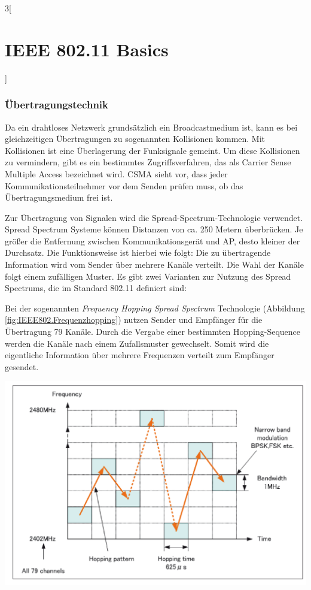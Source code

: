 \begin{multicols}{3}[\section{IEEE 802.11 Basics}]
\subsubsection*{Übertragungstechnik}
Da ein drahtloses Netzwerk grundsätzlich ein Broadcastmedium ist, kann es bei gleichzeitigen Übertragungen zu sogenannten Kollisionen kommen. Mit Kollisionen ist eine Überlagerung der Funksignale gemeint. Um diese Kollisionen zu vermindern, gibt es ein bestimmtes Zugriffsverfahren, das als Carrier Sense Multiple Access bezeichnet wird. CSMA sieht vor, dass jeder Kommunikationsteilnehmer vor dem Senden prüfen muss, ob das Übertragungsmedium frei ist. 

Zur Übertragung von Signalen wird die Spread-Spectrum-Technologie verwendet. Spread Spectrum Systeme können Distanzen von ca. 250 Metern überbrücken. Je größer die Entfernung zwischen Kommunikationsgerät und AP, desto kleiner der Durchsatz. Die Funktionsweise ist hierbei wie folgt: Die zu übertragende Information wird vom Sender über mehrere Kanäle verteilt. Die Wahl der Kanäle folgt einem zufälligen Muster. Es gibt zwei Varianten zur Nutzung des Spread Spectrums, die im Standard 802.11 definiert sind:

Bei der sogenannten \textit{Frequency Hopping Spread Spectrum} Technologie (Abbildung  \ref{fig:IEEE802.Frequenzhopping}) nutzen
Sender und Empfänger für die Übertragung 79 Kanäle. Durch die Vergabe einer bestimmten Hopping-Sequence werden die Kanäle nach einem Zufallsmuster gewechselt. Somit wird die eigentliche Information über mehrere Frequenzen verteilt zum Empfänger gesendet. 
\begin{Figure}
\includegraphics[width=\linewidth]{Kapitel/IEEE802.11/Grafiken/Frequenzhopping.png}
\label{fig:IEEE802.Frequenzhopping}
\end{Figure}


\end{multicols}
